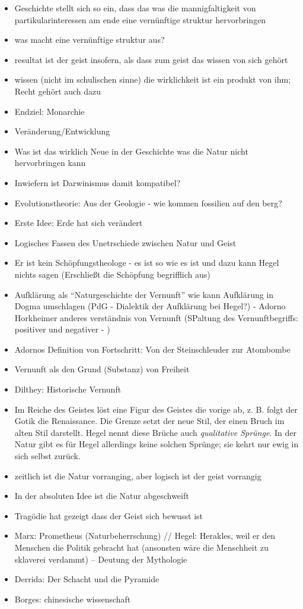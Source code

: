\documentclass[emulatestandardclasses]{scrartcl}
\begin{document}
\begin{itemize}
  \item Geschichte stellt sich so ein, dass das was die mannigfaltigkeit von partikularinteressen am ende eine vernünftige struktur hervorbringen
  \item was macht eine vernünftige struktur aus?
  \item resultat ist der geist insofern, als dass zum geist das wissen von sich gehört
  \item wissen (nicht im schulischen sinne) die wirklichkeit ist ein produkt von ihm; Recht gehört auch dazu
  \item Endziel: Monarchie
  \item Veränderung/Entwicklung
  \item Was ist das wirklich Neue in der Geschichte was die Natur nicht hervorbringen kann
  \item Inwiefern ist Darwinismus damit kompatibel?
  \item Evolutionstheorie: Aus der Geologie - wie kommen fossilien auf den berg?
  \item Erste Idee: Erde hat sich verändert
  \item Logisches Fassen des Unetrschiede zwischen Natur und Geist
  \item Er ist kein Schöpfungstheologe - es ist so wie es ist und dazu kann Hegel nichts sagen (Erschließt die Schöpfung begrifflich aus)
  \item Aufklärung als "`Naturgeschichte der Vernunft"' wie kann Aufklärung in Dogma umschlagen (PdG - Dialektik der Aufklärung bei Hegel?) - Adorno Horkheimer anderes verständnis von Vernunft (SPaltung des Vernunftbegriffs: positiver und negativer - )
  \item Adornos Definition von Fortschritt: Von der Steinschleuder zur Atombombe
  \item Vernunft als den Grund (Substanz) von Freiheit
  \item Dilthey: Historische Vernunft
  \item Im Reiche des Geistes löst eine Figur des Geistes die vorige ab, z. B. folgt der Gotik die Renaissance. Die Grenze setzt der neue Stil, der einen Bruch im alten Stil darstellt. Hegel nennt diese Brüche auch \emph{qualitative Sprünge}. In der Natur gibt es für Hegel allerdings keine solchen Sprünge; sie kehrt nur ewig in sich selbst zurück.
  \item zeitlich ist die Natur vorranging, aber logisch ist der geist vorrangig
  \item In der absoluten Idee ist die Natur abgeschweift
  \item Tragödie hat gezeigt dass der Geist sich bewusst ist
  \item Marx: Prometheus (Naturbeherrschung) // Hegel: Herakles, weil er den Menschen die Politik gebracht hat (ansonsten wäre die Menschheit zu sklaverei verdammt) -- Deutung der Mythologie
  \item Derrida: Der Schacht und die Pyramide
  \item Borges: chinesische wissenschaft
\end{itemize}
\end{document}

